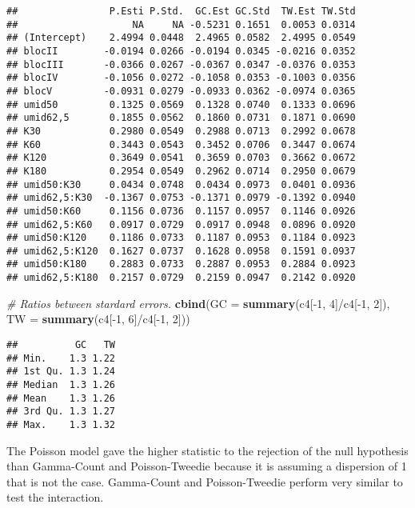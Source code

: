 \documentclass[9pt,a5paper,]{book}
\newenvironment{Shaded}{}{}
\newcommand{\KeywordTok}[1]{\textbf{{#1}}}
\newcommand{\DataTypeTok}[1]{\underline{{#1}}}
\newcommand{\DecValTok}[1]{{#1}}
\newcommand{\CommentTok}[1]{\textit{{#1}}}
\newcommand{\NormalTok}[1]{{#1}}
\renewenvironment{Shaded}{\color{inputcolor}}{}
\renewcommand{\DataTypeTok}[1]{{#1}}
\theoremstyle{definition}
\theoremstyle{definition}
\theoremstyle{remark}
\begin{document}
\begin{verbatim}
##                P.Esti P.Std.  GC.Est GC.Std  TW.Est TW.Std
##                    NA     NA -0.5231 0.1651  0.0053 0.0314
## (Intercept)    2.4994 0.0448  2.4965 0.0582  2.4995 0.0549
## blocII        -0.0194 0.0266 -0.0194 0.0345 -0.0216 0.0352
## blocIII       -0.0366 0.0267 -0.0367 0.0347 -0.0376 0.0353
## blocIV        -0.1056 0.0272 -0.1058 0.0353 -0.1003 0.0356
## blocV         -0.0931 0.0279 -0.0933 0.0362 -0.0974 0.0365
## umid50         0.1325 0.0569  0.1328 0.0740  0.1333 0.0696
## umid62,5       0.1855 0.0562  0.1860 0.0731  0.1871 0.0690
## K30            0.2980 0.0549  0.2988 0.0713  0.2992 0.0678
## K60            0.3443 0.0543  0.3452 0.0706  0.3447 0.0674
## K120           0.3649 0.0541  0.3659 0.0703  0.3662 0.0672
## K180           0.2954 0.0549  0.2962 0.0714  0.2950 0.0679
## umid50:K30     0.0434 0.0748  0.0434 0.0973  0.0401 0.0936
## umid62,5:K30  -0.1367 0.0753 -0.1371 0.0979 -0.1392 0.0940
## umid50:K60     0.1156 0.0736  0.1157 0.0957  0.1146 0.0926
## umid62,5:K60   0.0917 0.0729  0.0917 0.0948  0.0896 0.0920
## umid50:K120    0.1186 0.0733  0.1187 0.0953  0.1184 0.0923
## umid62,5:K120  0.1627 0.0737  0.1628 0.0958  0.1591 0.0937
## umid50:K180    0.2883 0.0733  0.2887 0.0953  0.2884 0.0923
## umid62,5:K180  0.2157 0.0729  0.2159 0.0947  0.2142 0.0920
\end{verbatim}

\begin{Shaded}
\begin{Highlighting}[]
\CommentTok{# Ratios between stardard errors.}
\KeywordTok{cbind}\NormalTok{(}\DataTypeTok{GC =} \KeywordTok{summary}\NormalTok{(c4[-}\DecValTok{1}\NormalTok{, }\DecValTok{4}\NormalTok{]/c4[-}\DecValTok{1}\NormalTok{, }\DecValTok{2}\NormalTok{]),}
      \DataTypeTok{TW =} \KeywordTok{summary}\NormalTok{(c4[-}\DecValTok{1}\NormalTok{, }\DecValTok{6}\NormalTok{]/c4[-}\DecValTok{1}\NormalTok{, }\DecValTok{2}\NormalTok{]))}
\end{Highlighting}
\end{Shaded}

\begin{verbatim}
##          GC   TW
## Min.    1.3 1.22
## 1st Qu. 1.3 1.24
## Median  1.3 1.26
## Mean    1.3 1.26
## 3rd Qu. 1.3 1.27
## Max.    1.3 1.32
\end{verbatim}

The Poisson model gave the higher statistic to the rejection of the null
hypothesis than Gamma-Count and Poisson-Tweedie because it is assuming a
dispersion of 1 that is not the case. Gamma-Count and Poisson-Tweedie
perform very similar to test the interaction.
\end{document}
